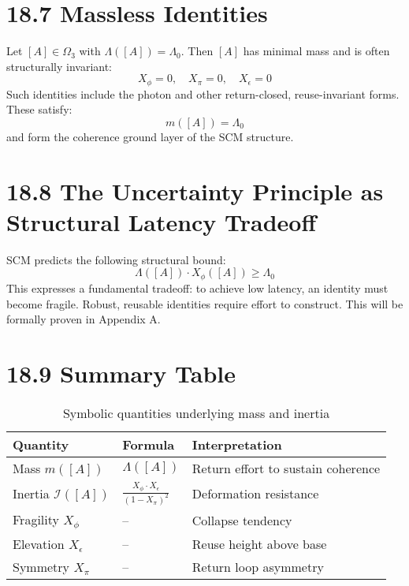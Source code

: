 \section{18.7 \textbar{} Massless Identities}
Let $[A] \in \Omega_3$ with $\Lambda([A]) = \Lambda_0$. Then $[A]$ has minimal mass and is often structurally invariant:
\[
X_\phi = 0, \quad X_\pi = 0, \quad X_\epsilon = 0
\]
Such identities include the photon and other return-closed, reuse-invariant forms. These satisfy:
\[
m([A]) = \Lambda_0
\]
and form the coherence ground layer of the SCM structure.

\section{18.8 \textbar{} The Uncertainty Principle as Structural Latency Tradeoff}
SCM predicts the following structural bound:
\[
\Lambda([A]) \cdot X_\phi([A]) \geq \Lambda_0
\]
This expresses a fundamental tradeoff: to achieve low latency, an identity must become fragile. Robust, reusable identities require effort to construct. This will be formally proven in Appendix A.

\section{18.9 \textbar{} Summary Table}

\begin{table}[h!]
\centering
\begin{tabular}{|l|l|l|}
\hline
\textbf{Quantity} & \textbf{Formula} & \textbf{Interpretation} \\
\hline
Mass $m([A])$ & $\Lambda([A])$ & Return effort to sustain coherence \\
Inertia $\mathcal{I}([A])$ & $\frac{X_\phi \cdot X_\epsilon}{(1 - X_\pi)^2}$ & Deformation resistance \\
Fragility $X_\phi$ & -- & Collapse tendency \\
Elevation $X_\epsilon$ & -- & Reuse height above base \\
Symmetry $X_\pi$ & -- & Return loop asymmetry \\
\hline
\end{tabular}
\caption{Symbolic quantities underlying mass and inertia}
\end{table}

